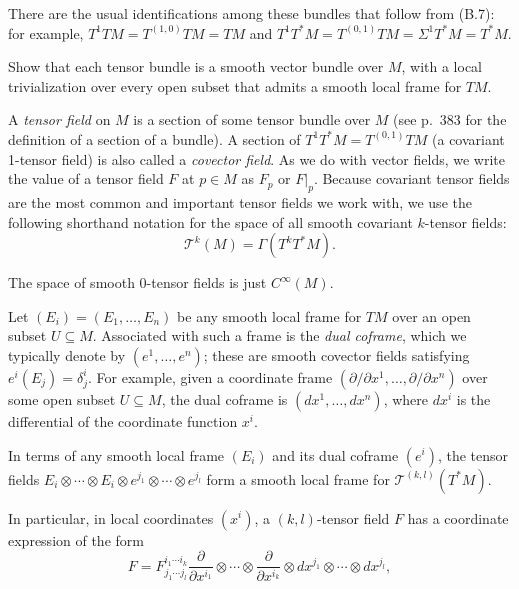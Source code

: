 There are the usual identifications among these bundles that follow from (B.7): for example, $T^1 T M = T^{(1,0)} T M = T M$ and $T^1 T^* M = T^{(0,1)} T M = \Sigma^1 T^* M = T^* M$.

\begin{exercise}\label{exer:tensor-bundle-smooth-vector-bundle}
Show that each tensor bundle is a smooth vector bundle over $M$, with a local trivialization over every open subset that admits a smooth local frame for $T M$.
\end{exercise}

A \textit{tensor field} on $M$ is a section of some tensor bundle over $M$ (see p.~383 for the definition of a section of a bundle). A section of $T^1 T^* M = T^{(0,1)} T M$ (a covariant 1-tensor field) is also called a \textit{covector field}. As we do with vector fields, we write the value of a tensor field $F$ at $p \in M$ as $F_p$ or $F|_p$. Because covariant tensor fields are the most common and important tensor fields we work with, we use the following shorthand notation for the space of all smooth covariant $k$-tensor fields:
\[\mathcal{T}^k(M) = \Gamma(T^k T^* M).\]

The space of smooth 0-tensor fields is just $C^\infty(M)$.

Let $(E_i) = (E_1, \ldots, E_n)$ be any smooth local frame for $T M$ over an open subset $U \subseteq M$. Associated with such a frame is the \textit{dual coframe}, which we typically denote by $(e^1, \ldots, e^n)$; these are smooth covector fields satisfying $e^i(E_j) = \delta^i_j$. For example, given a coordinate frame $(\partial/\partial x^1, \ldots, \partial/\partial x^n)$ over some open subset $U \subseteq M$, the dual coframe is $(dx^1, \ldots, dx^n)$, where $dx^i$ is the differential of the coordinate function $x^i$.

In terms of any smooth local frame $(E_i)$ and its dual coframe $(e^i)$, the tensor fields $E_i \otimes \cdots \otimes E_i \otimes e^{j_1} \otimes \cdots \otimes e^{j_l}$ form a smooth local frame for $\mathcal{T}^{(k,l)}(T^* M)$.

In particular, in local coordinates $(x^i)$, a $(k,l)$-tensor field $F$ has a coordinate expression of the form
\begin{equation}
F = F^{i_1 \cdots i_k}_{j_1 \cdots j_l} \frac{\partial}{\partial x^{i_1}} \otimes \cdots \otimes \frac{\partial}{\partial x^{i_k}} \otimes dx^{j_1} \otimes \cdots \otimes dx^{j_l}, \tag{B.8}
\end{equation}

